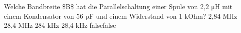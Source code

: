     {Welche Bandbreite \$B\$ hat die Parallelschaltung einer Spule von 2,2 μH mit einem Kondensator von 56 pF und einem Widerstand von 1 kOhm?}
    {2,84 MHz}
    {28,4 MHz}
    {284 kHz}
    {28,4 kHz}
    {false}{false}